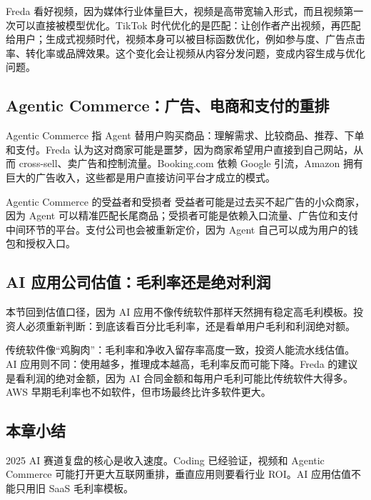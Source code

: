 Freda 看好视频，因为媒体行业体量巨大，视频是高带宽输入形式，而且视频第一次可以直接被模型优化。TikTok 时代优化的是匹配：让创作者产出视频，再匹配给用户；生成式视频时代，视频本身可以被目标函数优化，例如参与度、广告点击率、转化率或品牌效果。这个变化会让视频从内容分发问题，变成内容生成与优化问题。

\subsection{Agentic Commerce：广告、电商和支付的重排}

Agentic Commerce 指 Agent 替用户购买商品：理解需求、比较商品、推荐、下单和支付。Freda 认为这对商家可能是噩梦，因为商家希望用户直接到自己网站，从而 cross-sell、卖广告和控制流量。Booking.com 依赖 Google 引流，Amazon 拥有巨大的广告收入，这些都是用户直接访问平台才成立的模式。

\begin{importantbox}{Agentic Commerce 的受益者和受损者}
受益者可能是过去买不起广告的小众商家，因为 Agent 可以精准匹配长尾商品；受损者可能是依赖入口流量、广告位和支付中间环节的平台。支付公司也会被重新定价，因为 Agent 自己可以成为用户的钱包和授权入口。
\end{importantbox}

\subsection{AI 应用公司估值：毛利率还是绝对利润}

本节回到估值口径，因为 AI 应用不像传统软件那样天然拥有稳定高毛利模板。投资人必须重新判断：到底该看百分比毛利率，还是看单用户毛利和利润绝对额。

传统软件像“鸡胸肉”：毛利率和净收入留存率高度一致，投资人能流水线估值。AI 应用则不同：使用越多，推理成本越高，毛利率反而可能下降。Freda 的建议是看利润的绝对金额，因为 AI 合同金额和每用户毛利可能比传统软件大得多。AWS 早期毛利率也不如软件，但市场最终比许多软件更大。

\subsection{本章小结}

2025 AI 赛道复盘的核心是收入速度。Coding 已经验证，视频和 Agentic Commerce 可能打开更大互联网重排，垂直应用则要看行业 ROI。AI 应用估值不能只用旧 SaaS 毛利率模板。


